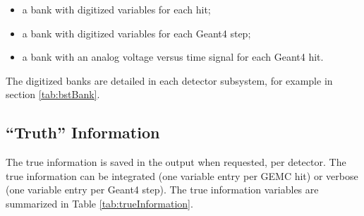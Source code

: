 \begin{itemize}
	\item a bank with digitized variables for each hit;
	\item a bank with digitized variables for each Geant4 step;
	\item a bank with an analog voltage versus time signal for each Geant4 hit.
\end{itemize}

The digitized banks are detailed in each detector subsystem, for example in section \ref{tab:bstBank}.

\subsection{``Truth'' Information}

The true information is saved in the output when requested, per detector. The true information can
be integrated (one variable entry per GEMC hit) or verbose (one variable entry per Geant4 step).
The true information variables are summarized in Table \ref{tab:trueInformation}.

